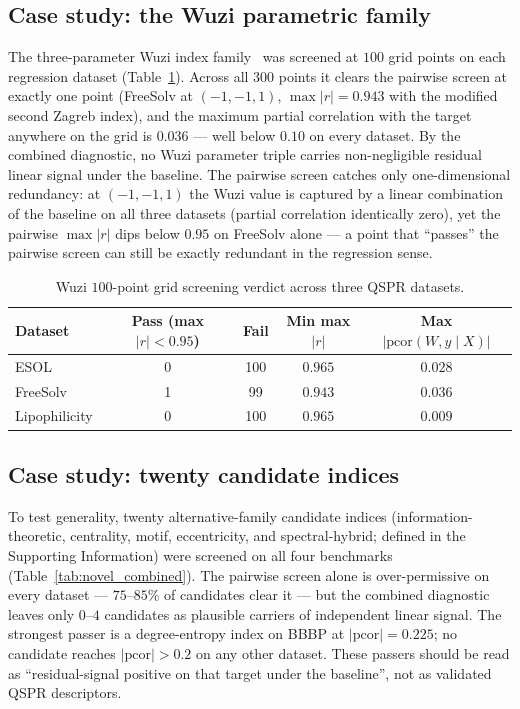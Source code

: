 \documentclass[11pt,a4paper]{article}
\theoremstyle{definition}
\begin{document}
\subsection{Case study: the Wuzi parametric family}

The three-parameter Wuzi index family~\cite{Paper1_Wuzi} was
screened at $100$ grid points on each regression dataset
(Table~\ref{tab:wuzi_verdict_paper1}). Across all $300$ points it
clears the pairwise screen at exactly one point (FreeSolv at
$(-1,-1,1)$, $\max|r| = 0.943$ with the modified second Zagreb
index), and the maximum partial correlation with the target
anywhere on the grid is $0.036$ --- well below $0.10$ on every
dataset. By the combined diagnostic, no Wuzi parameter triple
carries non-negligible residual linear signal under the baseline.
The pairwise screen catches only one-dimensional redundancy: at
$(-1,-1,1)$ the Wuzi value is captured by a linear combination of
the baseline on all three datasets (partial correlation identically
zero), yet the pairwise $\max|r|$ dips below $0.95$ on FreeSolv
alone --- a point that ``passes'' the pairwise screen can still be
exactly redundant in the regression sense.

\begin{table}[h]
\centering
\small
\caption{Wuzi $100$-point grid screening verdict across three QSPR datasets.}
\label{tab:wuzi_verdict_paper1}
\begin{tabular}{lcccc}
\toprule
Dataset & Pass (max $\lvert r\rvert < 0.95$) & Fail & Min max $\lvert r\rvert$ & Max $\lvert\mathrm{pcor}(W, y \mid X)\rvert$\\
\midrule
ESOL          & 0 & 100 & $0.965$ & $0.028$\\
FreeSolv      & 1 &  99 & $0.943$ & $0.036$\\
Lipophilicity & 0 & 100 & $0.965$ & $0.009$\\
\bottomrule
\end{tabular}
\end{table}

\subsection{Case study: twenty candidate indices}

To test generality, twenty alternative-family candidate indices
(information-theoretic, centrality, motif, eccentricity, and
spectral-hybrid; defined in the Supporting Information) were
screened on all four benchmarks (Table~\ref{tab:novel_combined}).
The pairwise screen alone is over-permissive on every dataset ---
$75$--$85\%$ of candidates clear it --- but the combined diagnostic
leaves only $0$--$4$ candidates as plausible carriers of
independent linear signal. The strongest passer is a degree-entropy
index on BBBP at $|\mathrm{pcor}| = 0.225$; no candidate reaches
$|\mathrm{pcor}| > 0.2$ on any other dataset. These passers should
be read as ``residual-signal positive on that target under the
baseline'', not as validated QSPR descriptors.
\end{document}
